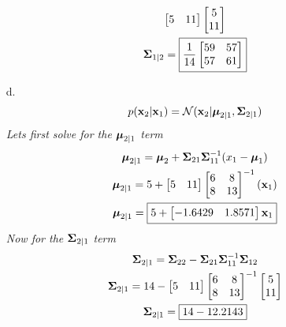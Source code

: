 \documentclass[12pt,letterpaper,fleqn]{hmcpset}
\begin{document}
\begin{solution}
\begin{enumerate}
\begin{gather*}
\begin{bmatrix}
5&11
\end{bmatrix}
 \begin{bmatrix}
5\\11
\end{bmatrix}
\\
\hbox{\boldmath$\Sigma$}_{1|2} =\boxed{ \frac{1}{14}\begin{bmatrix}
59 &57\\57&61
\end{bmatrix}}
\end{gather*}
\item[d.]
\begin{gather*}
p({\bf x}_2|{\bf x}_1) = \mathcal{N}({\bf x}_2 | \hbox{\boldmath$\mu$}_{2|1}, \hbox{\boldmath$\Sigma$}_{2|1})
\end{gather*}
\textit{Lets first solve for the $\boldsymbol{\mu}_{2|1}$ term}
\begin{gather*}
\hbox{\boldmath$\mu$}_{2|1} = \hbox{\boldmath$\mu$}_2+\hbox{\boldmath$\Sigma$}_{21} \hbox{\boldmath$\Sigma$}_{11}^{-1}(x_1-\hbox{\boldmath$\mu$}_{1}) \\
\hbox{\boldmath$\mu$}_{2|1} = 5 + 
\begin{bmatrix}
5 &11
\end{bmatrix} \begin{bmatrix}
6&8\\8&13
\end{bmatrix}^{-1}({\bf x}_1)\\
\hbox{\boldmath$\mu$}_{2|1} =\boxed{ 5 + \begin{bmatrix}
-1.6429 & 1.8571
\end{bmatrix} {\bf x}_1}
\end{gather*}
\textit{Now for the $\hbox{\boldmath$\Sigma$}_{2|1}$ term} 
\begin{gather*}
\hbox{\boldmath$\Sigma$}_{2|1} = \hbox{\boldmath$\Sigma$}_{22} - \hbox{\boldmath$\Sigma$}_{21} \hbox{\boldmath$\Sigma$}_{11}^{-1} \hbox{\boldmath$\Sigma$}_{12}\\
\hbox{\boldmath$\Sigma$}_{2|1} = 14 -\begin{bmatrix}
5 &11
\end{bmatrix}
 \begin{bmatrix}
6&8\\8&13
\end{bmatrix}^{-1}
 \begin{bmatrix}
5 \\ 11
\end{bmatrix}\\
\hbox{\boldmath$\Sigma$}_{2|1} = \boxed{14-12.2143}
\end{gather*}
\end{enumerate}
\end{solution}
\newpage
\end{document}
